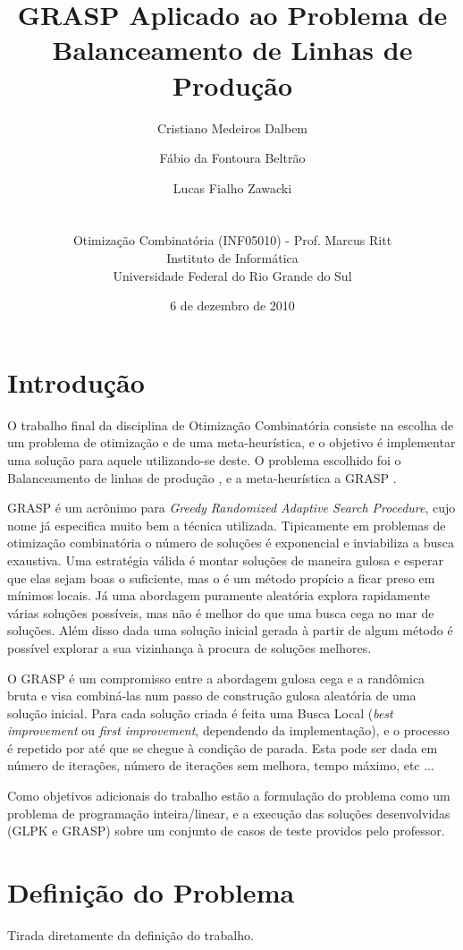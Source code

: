\documentclass{report}
\title{GRASP Aplicado ao Problema de Balanceamento de Linhas de Produção}
\author{Cristiano Medeiros Dalbem \and Fábio da Fontoura Beltrão \and Lucas Fialho Zawacki\\
\\
\\
\small Otimização Combinatória (INF05010) - Prof. Marcus Ritt\\
\small Instituto de Informática\\[-0.8ex]
\small Universidade Federal do Rio Grande do Sul
}
\date{6 de dezembro de 2010}
\begin{document}
\maketitle
\tableofcontents

\chapter{Introdução}

O trabalho final da disciplina de Otimização Combinatória consiste na escolha de
 um problema de otimização e de uma meta-heurística, e o objetivo é implementar
 uma solução para aquele utilizando-se deste. O problema escolhido foi o
 Balanceamento de linhas de produção \cite{salbp}, e a meta-heurística a GRASP \cite{grasp}.

GRASP é um acrônimo para \emph{Greedy Randomized Adaptive Search Procedure},
cujo nome já especifica muito bem a técnica utilizada. Tipicamente em problemas
de otimização combinatória o número de soluções é exponencial e inviabiliza a
busca exaustiva. Uma estratégia válida é montar soluções de maneira gulosa e
esperar que elas sejam boas o suficiente, mas o é um método propício a ficar
preso em mínimos locais. Já uma abordagem puramente aleatória explora rapidamente
várias soluções possíveis, mas não é melhor do que uma busca cega no mar de soluções.
Além disso dada uma solução inicial gerada à partir de algum método é possível
explorar a sua vizinhança à procura de soluções melhores.

O GRASP é um compromisso entre a abordagem gulosa cega e a randômica bruta e
visa combiná-las num passo de construção gulosa aleatória de uma solução
inicial. Para cada solução criada é feita uma Busca Local (\emph{best improvement} ou
\emph{first improvement}, dependendo da implementação),
e o processo é repetido por até que se chegue à condição de parada. Esta pode ser
dada em número de iterações, número de iterações sem melhora, tempo máximo, etc ...

Como objetivos adicionais do trabalho estão a formulação do problema como
um problema de programação inteira/linear, e a execução das soluções
desenvolvidas (GLPK e GRASP) sobre um conjunto de casos de
teste providos pelo professor.

\chapter{Definição do Problema}

Tirada diretamente da definição do trabalho.
\end{document}
